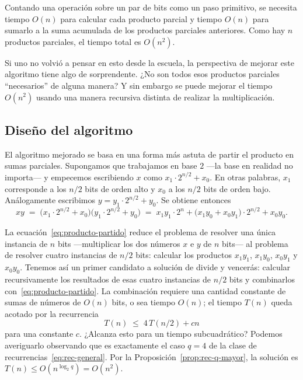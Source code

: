 \documentclass[12pt, spanish, oneside, openany]{book}
\theoremstyle{uprightplain}
\theoremstyle{definition}
\theoremstyle{remark}
\theoremstyle{definition}
\begin{document}
Contando una operación sobre un par de bits como un paso primitivo, se necesita tiempo $O(n)$ para calcular cada producto parcial y tiempo $O(n)$ para sumarlo a la suma acumulada de los productos parciales anteriores. Como hay $n$ productos parciales, el tiempo total es $O(n^2)$.

Si uno no volvió a pensar en esto desde la escuela, la perspectiva de mejorar este algoritmo tiene algo de sorprendente. ¿No son todos esos productos parciales ``necesarios'' de alguna manera? Y sin embargo se puede mejorar el tiempo $O(n^2)$ usando una manera recursiva distinta de realizar la multiplicación.

\subsection{Diseño del algoritmo}

El algoritmo mejorado se basa en una forma más astuta de partir el producto en sumas parciales. Supongamos que trabajamos en base $2$ ---la base en realidad no importa--- y empecemos escribiendo $x$ como $x_1\cdot 2^{n/2}+x_0$. En otras palabras, $x_1$ corresponde a los $n/2$ bits de orden alto y $x_0$ a los $n/2$ bits de orden bajo. Análogamente escribimos $y=y_1\cdot 2^{n/2}+y_0$. Se obtiene entonces
\begin{equation}
\label{eq:producto-partido}
xy \;=\; \big(x_1\cdot 2^{n/2}+x_0\big)\big(y_1\cdot 2^{n/2}+y_0\big)
   \;=\; x_1y_1\cdot 2^{n} + \big(x_1y_0+x_0y_1\big)\cdot 2^{n/2} + x_0y_0 .
\end{equation}

La ecuación~\eqref{eq:producto-partido} reduce el problema de resolver una única instancia de $n$ bits ---multiplicar los dos números $x$ e $y$ de $n$ bits--- al problema de resolver cuatro instancias de $n/2$ bits: calcular los productos $x_1y_1$, $x_1y_0$, $x_0y_1$ y $x_0y_0$. Tenemos así un primer candidato a solución de divide y vencerás: calcular recursivamente los resultados de esas cuatro instancias de $n/2$ bits y combinarlos con~\eqref{eq:producto-partido}. La combinación requiere una cantidad constante de sumas de números de $O(n)$ bits, o sea tiempo $O(n)$; el tiempo $T(n)$ queda acotado por la recurrencia
\[
T(n) \;\le\; 4\,T(n/2) + cn
\]
para una constante $c$. ¿Alcanza esto para un tiempo subcuadrático? Podemos averiguarlo observando que es exactamente el caso $q=4$ de la clase de recurrencias~\eqref{eq:rec-general}. Por la Proposición~\ref{prop:rec-q-mayor}, la solución es $T(n)\le O(n^{\log_2 q})=O(n^2)$.
\end{document}
